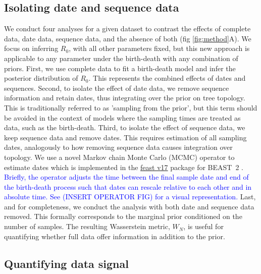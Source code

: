 \documentclass{article}
\begin{document}
\subsection*{Isolating date and sequence data}
We conduct four analyses for a given dataset to contrast the effects of complete data, date data, sequence data, and the absence of both (fig \ref{fig:method}A). We focus on inferring $R_{0}$, with all other parameters fixed, but this new approach is applicable to any parameter under the birth-death with any combination of priors. First, we use complete data to fit a birth-death model and infer the posterior distribution of $R_{0}$. This represents the combined effects of dates and sequences. Second, to isolate the effect of date data, we remove sequence information and retain dates, thus integrating over the prior on tree topology. This is traditionally referred to as 'sampling from the prior', but this term should be avoided in the context of models where the sampling times are treated as data, such as the birth-death. Third, to isolate the effect of sequence data, we keep sequence data and remove dates. This requires estimation of all sampling dates, analogously to how removing sequence data causes integration over topology. We use a novel Markov chain Monte Carlo (MCMC) operator to estimate dates which is implemented in the \href{https://github.com/tgvaughan/feast}{feast v17} package for BEAST~2 \citep{bouckaert_beast_2019}. \textcolor{blue}{Briefly, the operator adjusts the time between the final sample date and end of the birth-death process such that dates can rescale relative to each other and in absolute time. See (INSERT OPERATOR FIG) for a visual representation.} Last, and for completeness, we conduct the analysis with both date and sequence data removed. This formally corresponds to the marginal prior conditioned on the number of samples. The resulting Wasserstein metric, $W_N$, is useful for quantifying whether full data offer information in addition to the prior.
\subsection*{Quantifying data signal}
\end{document}
